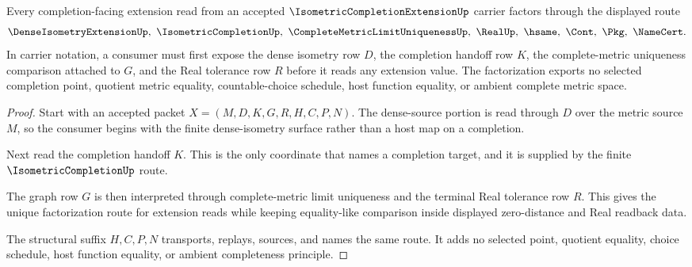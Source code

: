 \begin{theorem}
\label{thm:isometric-completion-extension-unique-factorization}
Every completion-facing extension read from an accepted $\IsometricCompletionExtensionUp$ carrier factors through the displayed route
$$
\DenseIsometryExtensionUp,\ \IsometricCompletionUp,\ \CompleteMetricLimitUniquenessUp,\ \RealUp,\ \hsame,\ \Cont,\ \Pkg,\ \NameCert .
$$
In carrier notation, a consumer must first expose the dense isometry row $D$, the completion handoff row $K$, the complete-metric uniqueness comparison attached to $G$, and the Real tolerance row $R$ before it reads any extension value. The factorization exports no selected completion point, quotient metric equality, countable-choice schedule, host function equality, or ambient complete metric space.
\end{theorem}
\begin{proof}
Start with an accepted packet $X=(M,D,K,G,R,H,C,P,N)$. The dense-source portion is read through $D$ over the metric source $M$, so the consumer begins with the finite dense-isometry surface rather than a host map on a completion.

Next read the completion handoff $K$. This is the only coordinate that names a completion target, and it is supplied by the finite $\IsometricCompletionUp$ route.

The graph row $G$ is then interpreted through complete-metric limit uniqueness and the terminal Real tolerance row $R$. This gives the unique factorization route for extension reads while keeping equality-like comparison inside displayed zero-distance and Real readback data.

The structural suffix $H,C,P,N$ transports, replays, sources, and names the same route. It adds no selected point, quotient equality, choice schedule, host function equality, or ambient completeness principle.
\end{proof}



